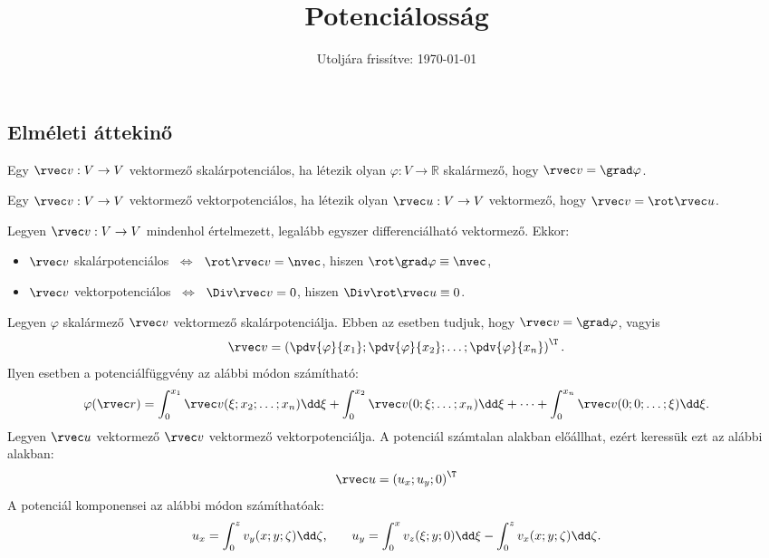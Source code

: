 \documentclass[a4paper, 12pt]{scrartcl}
\title{Potenciálosság}
\date{Utoljára frissítve: \today}
\begin{document}
\allowdisplaybreaks

\maketitle

\vspace{-1em}

\subsection{Elméleti áttekinő}

\begin{definition}[Skalárpotenciálosság]
  Egy $\rvec v: V \rightarrow V$ vektormező skalárpotenciálos, ha létezik olyan
  $\varphi: V \rightarrow \mathbb R$ skalármező, hogy $\rvec v = \grad \varphi$.
\end{definition}

\begin{definition}[Vektorpotenciálosság]
  Egy $\rvec v: V \rightarrow V$ vektormező vektorpotenciálos, ha létezik olyan
  $\rvec u: V \rightarrow V$ vektormező, hogy $\rvec v = \rot \rvec u$.
\end{definition}

\begin{theorem}
  Legyen $\rvec v: V \rightarrow V$ mindenhol értelmezett, legalább egyszer
  differenciálható vektormező. Ekkor:
  \begin{itemize}
    \item $\rvec v$ skalárpotenciálos
          $\;\Leftrightarrow\;$
          $\rot \rvec v = \nvec$,
          hiszen $\rot \grad \varphi \equiv \nvec$,
    \item $\rvec v$ vektorpotenciálos
          $\;\Leftrightarrow\;$
          $\Div \rvec v = 0$,
          hiszen $\Div \rot \rvec u \equiv 0$.
  \end{itemize}
\end{theorem}

\begin{blueBox}

  Legyen $\varphi$ skalármező $\rvec v$ vektormező skalárpotenciálja. Ebben
  az esetben tudjuk, hogy $\rvec v = \grad \varphi$, vagyis
  \[
    \rvec v = \left(
    \pdv{\varphi}{x_1};
    \pdv{\varphi}{x_2};
    \dots;
    \pdv{\varphi}{x_n}
    \right)^\T
    \text.
  \]
  Ilyen esetben a potenciálfüggvény az alábbi módon számítható:
  \[
    \varphi (\rvec r)
    = \int_0^{x_1} \rvec v(\xi; x_2; \dots; x_n) \dd \xi
    + \int_0^{x_2} \rvec v(0; \xi; \dots; x_n) \dd \xi
    + \dots
    + \int_0^{x_n} \rvec v(0; 0; \dots; \xi) \dd \xi
    \text.
  \]
  Legyen $\rvec u$ vektormező $\rvec v$ vektormező vektorpotenciálja.
  A potenciál számtalan alakban előállhat, ezért keressük ezt az alábbi alakban:
  \[
    \rvec u = \left( u_x; u_y; 0 \right)^\T
  \]
  A potenciál komponensei az alábbi módon számíthatóak:
  \[
    u_x = \int_0^z v_y(x; y; \zeta) \dd \zeta
    \text,
    \qquad
    u_y = \int_0^x v_z(\xi; y; 0) \dd \xi
    - \int_0^z v_x(x; y; \zeta) \dd \zeta
    \text.
  \]
\end{blueBox}
\end{document}
